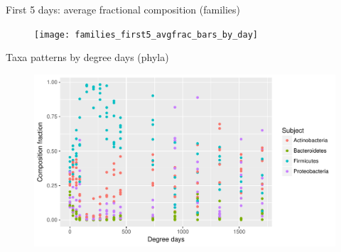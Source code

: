 \documentclass{beamer}
\begin{document}
\begin{frame}{First 5 days: average fractional composition (families)}

\begin{center}
\begin{figure}
  \texttt{[image: families\_first5\_avgfrac\_bars\_by\_day]}
\end{figure}
\end{center}
\vspace{-0.05in}

\end{frame}



\begin{frame}{Taxa patterns by degree days (phyla)}

\begin{center}
\begin{figure}
  \includegraphics[width=4.5in]{phyla_scatter_frac_by_degday}
\end{figure}
\end{center}
\vspace{-0.1in}

\end{frame}
\end{document}
